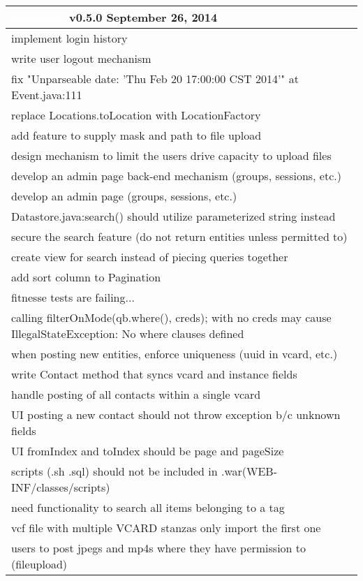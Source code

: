 \documentclass[notitlepage]{article}
\newcommand{\releasedate}{September 26, 2014}
\begin{document}
\begin{center}
\begin{tabular}{ | l | }
\hline
\LARGE\cellcolor{myblue}\textcolor{white}{khallware} v0.5.0 \releasedate{} \\
\hline
implement login history \\
\hline
write user logout mechanism \\
\hline
fix "Unparseable date: 'Thu Feb 20 17:00:00 CST 2014'" at Event.java:111 \\
\hline
replace Locations.toLocation with LocationFactory \\
\hline
add feature to supply mask and path to file upload \\
\hline
design mechanism to limit the users drive capacity to upload files \\
\hline
develop an admin page back-end mechanism (groups, sessions, etc.) \\
\hline
develop an admin page (groups, sessions, etc.) \\
\hline
Datastore.java:search() should utilize parameterized string instead \\
\hline
secure the search feature (do not return entities unless permitted to) \\
\hline
create view for search instead of piecing queries together \\
\hline
add sort column to Pagination \\
\hline
fitnesse tests are failing... \\
\hline
calling filterOnMode(qb.where(), creds); with no creds may cause IllegalStateException: No where clauses defined \\
\hline
when posting new entities, enforce uniqueness (uuid in vcard, etc.) \\
\hline
write Contact method that syncs vcard and instance fields \\
\hline
handle posting of all contacts within a single vcard \\
\hline
UI posting a new contact should not throw exception b/c unknown fields \\
\hline
UI fromIndex and toIndex should be page and pageSize \\
\hline
scripts (.sh .sql) should not be included in .war(WEB-INF/classes/scripts) \\
\hline
need functionality to search all items belonging to a tag \\
\hline
vcf file with multiple VCARD stanzas only import the first one \\
\hline
users to post jpegs and mp4s where they have permission to (fileupload) \\
\hline

\end{tabular}
\end{center}
\end{document}
